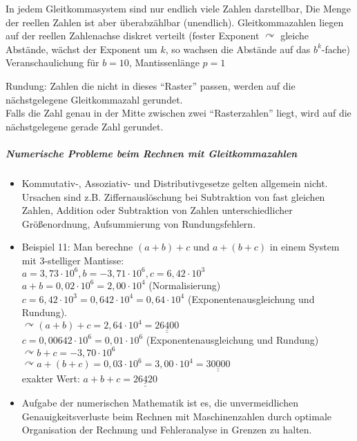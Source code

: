 \documentclass[a4paper]{scrartcl}
\begin{document}
In jedem Gleitkommasystem sind nur endlich viele Zahlen darstellbar, Die Menge der reellen Zahlen ist aber überabzählbar (unendlich). Gleitkommazahlen liegen auf der reellen Zahlenachse diskret verteilt (fester Exponent $\curvearrowright$ gleiche Abstände, wächst der Exponent um $k$, so wachsen die Abstände auf das $b^k$-fache)\\
Veranschaulichung für $b=10$, Mantissenlänge $p=1$

Rundung: Zahlen die nicht in dieses "`Raster"' passen, werden auf die nächstgelegene Gleitkommazahl gerundet.\\
Falls die Zahl genau in der Mitte zwischen zwei "`Rasterzahlen"' liegt, wird auf die nächstgelegene gerade Zahl gerundet.

\subparagraph{Numerische Probleme beim Rechnen mit Gleitkommazahlen}
\begin{itemize}
\item Kommutativ-, Assoziativ- und Distributivgesetze gelten allgemein nicht. Ursachen sind z.B. Ziffernauslöschung bei Subtraktion von fast gleichen Zahlen, Addition oder Subtraktion von Zahlen unterschiedlicher Größenordnung, Aufsummierung von Rundungsfehlern.
\item Beispiel 11:
Man berechne $(a+b)+c$ und $a+(b+c)$ in einem System mit 3-stelliger Mantisse:\\
$a=3,73 \cdot 10^6, b= -3,71 \cdot 10^6, c=6,42\cdot 10^3$\\
$a+b = 0,02\cdot 10^6=2,00\cdot 10^4$ (Normalisierung) $c=6,42\cdot 10^3 = 0,642 \cdot 10^4 = 0,64\cdot 10^4$ (Exponentenausgleichung und Rundung).\\
$\curvearrowright (a+b) +c =2,64\cdot 10^4 = \underline{\underline{26400}}$\\
$c=0,00642 \cdot 10^6 = 0,01 \cdot 10^6$ (Exponentenausgleichung und Rundung)\\
$\curvearrowright b+c=-3,70\cdot 10^6$\\
$\curvearrowright a+(b+c) = 0,03 \cdot 10^6 = 3,00\cdot 10^4 = \underline{\underline{30 000}}$\\
exakter Wert: $a+b+c=\underline{\underline{26420}}$
\item Aufgabe der numerischen Mathematik ist es, die unvermeidlichen Genauigkeitsverluste beim Rechnen mit Maschinenzahlen durch optimale Organisation der Rechnung und Fehleranalyse in Grenzen zu halten.

\end{itemize}
\end{document}
